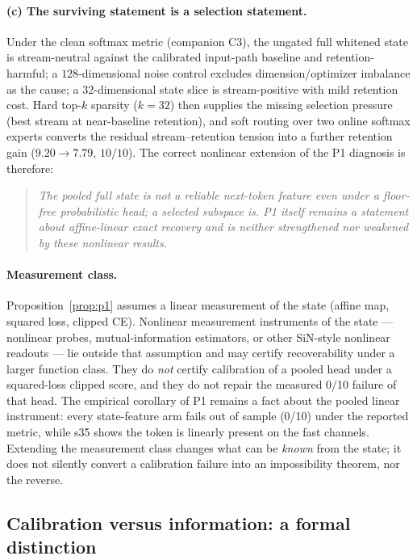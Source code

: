 \documentclass[preprint,12pt]{elsarticle}
\begin{document}
\paragraph{(c) The surviving statement is a selection statement.}
Under the clean softmax metric (companion C3), the ungated full
whitened state is stream-neutral against the calibrated input-path
baseline and retention-harmful; a $128$-dimensional noise control
excludes dimension/optimizer imbalance as the cause; a
$32$-dimensional state slice is stream-positive with mild retention
cost. Hard top-$k$ sparsity ($k=32$) then supplies the missing
selection pressure (best stream at near-baseline retention), and soft
routing over two online softmax experts converts the residual
stream--retention tension into a further retention gain
($9.20\to 7.79$, $10/10$). The correct nonlinear extension of the P1
diagnosis is therefore:

\begin{quote}
\itshape
The pooled full state is not a reliable next-token feature even under
a floor-free probabilistic head; a \emph{selected} subspace is. P1
itself remains a statement about affine-linear exact recovery and is
neither strengthened nor weakened by these nonlinear results.
\end{quote}

\paragraph{Measurement class.}
Proposition~\ref{prop:p1} assumes a linear measurement of the state
(affine map, squared loss, clipped CE). Nonlinear measurement
instruments of the state --- nonlinear probes, mutual-information
estimators, or other SiN-style nonlinear readouts --- lie outside that
assumption and may certify recoverability under a larger function
class. They do \emph{not} certify calibration of a pooled head under a
squared-loss clipped score, and they do not repair the measured 0/10
failure of that head. The empirical corollary of P1 remains a fact
about the pooled linear instrument: every state-feature arm fails out
of sample (0/10) under the reported metric, while s35 shows the token
is linearly present on the fast channels. Extending the measurement
class changes what can be \emph{known} from the state; it does not
silently convert a calibration failure into an impossibility theorem,
nor the reverse.

\subsection{Calibration versus information: a formal distinction}
\label{sec:calinfo}
\end{document}
